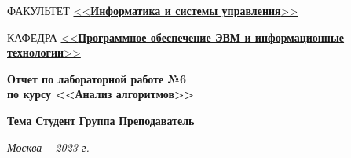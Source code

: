 \begin{titlepage}
\begin{flushleft}
		ФАКУЛЬТЕТ \uline{<<\textbf{Информатика и системы управления}>> \hfill}

		
		КАФЕДРА \uline{\mbox{\hspace{4mm}} <<\textbf{Программное обеспечение ЭВМ и информационные технологии}>> \hfill}
	\end{flushleft}
	\vspace*{\fill}
	
	\begin{center}
	\fontsize{20pt}{\baselineskip}\selectfont
	
	\textbf{Отчет по лабораторной работе №6\\ по курсу <<Анализ алгоритмов>>}
	
	\end{center}
	\textbf{Тема} \uline{\hfill}\newline\newline
	\textbf{Студент} \uline{\hfill}\newline\newline
	\textbf{Группа} \uline{\hfill}\newline\newline
	\textbf{Преподаватель} \uline{\hfill}\newline\newline
	\vspace*{\fill}
	
	\begin{center}
		\normalsize \textit{Москва -- 2023 г.}
	\end{center}
	

\end{titlepage}
\addtocounter{page}{1}